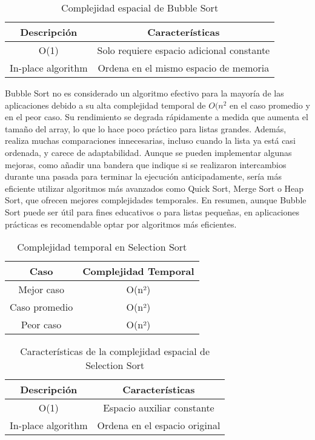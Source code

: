 \begin{table}[htbp]
    \centering
    \small
    \begin{tabular}{|c|c|}
        \hline
        \textbf{Descripción} & \textbf{Características} \\
        \hline
        O(1) & Solo requiere espacio adicional constante \\
        \hline
        In-place algorithm & Ordena en el mismo espacio de memoria \\
        \hline
    \end{tabular}
    \caption{Complejidad espacial de Bubble Sort}
    \label{tab:complejidad_espacial}
\end{table}

Bubble Sort no es considerado un algoritmo efectivo para la mayoría de las aplicaciones debido a su alta complejidad temporal de \(O(n^2\) en el caso promedio y en el peor caso. Su rendimiento se degrada rápidamente a medida que aumenta el tamaño del array, lo que lo hace poco práctico para listas grandes. Además, realiza muchas comparaciones innecesarias, incluso cuando la lista ya está casi ordenada, y carece de adaptabilidad. Aunque se pueden implementar algunas mejoras, como añadir una bandera que indique si se realizaron intercambios durante una pasada para terminar la ejecución anticipadamente, sería más eficiente utilizar algoritmos más avanzados como Quick Sort, Merge Sort o Heap Sort, que ofrecen mejores complejidades temporales. En resumen, aunque Bubble Sort puede ser útil para fines educativos o para listas pequeñas, en aplicaciones prácticas es recomendable optar por algoritmos más eficientes.

\begin{table}[htbp]
    \centering
    \small
    \begin{tabular}{|c|c|}
        \hline
        \textbf{Caso} & \textbf{Complejidad Temporal} \\
        \hline
        Mejor caso & O(n²) \\
        \hline
        Caso promedio & O(n²) \\
        \hline
        Peor caso & O(n²) \\
        \hline
    \end{tabular}
    \caption{Complejidad temporal en Selection Sort}
    \label{tab:complejidad_casos_uniforme}
\end{table}

\begin{table}[htbp]
    \centering
    \small
    \begin{tabular}{|c|c|}
        \hline
        \textbf{Descripción} & \textbf{Características} \\
        \hline
        O(1) & Espacio auxiliar constante \\
        \hline
        In-place algorithm & Ordena en el espacio original \\
        \hline
    \end{tabular}
    \caption{Características de la complejidad espacial de Selection Sort}
    \label{tab:caracteristicas_espacial}
\end{table}

